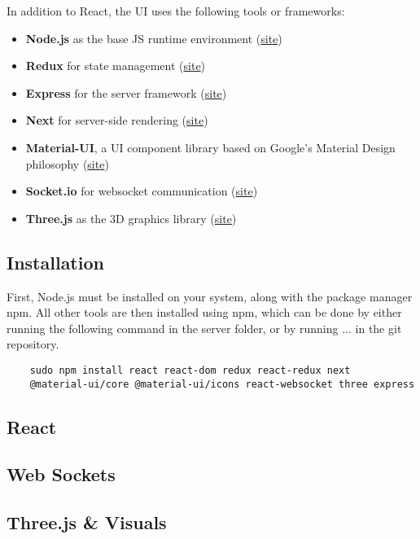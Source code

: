 \documentclass{article}
\begin{document}
	In addition to React, the UI uses the following tools or frameworks: 
	
	\begin{itemize}
		\item \textbf{Node.js} as the base JS runtime environment (\href{https://nodejs.org/en/}{site})
		\item \textbf{Redux} for state management (\href{https://redux.js.org/}{site})
		\item \textbf{Express} for the server framework (\href{https://expressjs.com/}{site})
		\item \textbf{Next} for server-side rendering (\href{https://nextjs.org/}{site})
		\item \textbf{Material-UI}, a UI component library based on Google's Material Design philosophy (\href{https://material-ui.com/}{site})
		\item \textbf{Socket.io} for websocket communication (\href{https://socket.io/}{site})
		\item \textbf{Three.js} as the 3D graphics library (\href{https://threejs.org/}{site})
	\end{itemize}
	
	\subsection{Installation}
	
	First, Node.js must be installed on your system, along with the package manager npm. All other tools are then installed using npm, which can be done by either running the following command in the server folder, or by running ... in the git repository.
	
	\begin{verbatim}
	sudo npm install react react-dom redux react-redux next 
	@material-ui/core @material-ui/icons react-websocket three express
	\end{verbatim}
	
	\subsection{React}
	\subsection{Web Sockets}
	
	\subsection{Three.js \& Visuals}
\end{document}
